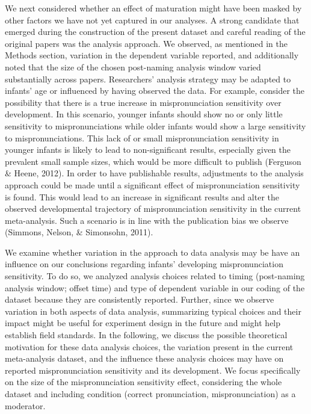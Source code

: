\documentclass[man, noextraspace]{apa6}
\begin{document}
We next considered whether an effect of maturation might have been masked by other factors we have not yet captured in our analyses. A strong candidate that emerged during the construction of the present dataset and careful reading of the original papers was the analysis approach. We observed, as mentioned in the Methods section, variation in the dependent variable reported, and additionally noted that the size of the chosen post-naming analysis window varied substantially across papers. Researchers' analysis strategy may be adapted to infants' age or influenced by having observed the data. For example, consider the possibility that there is a true increase in mispronunciation sensitivity over development. In this scenario, younger infants should show no or only little sensitivity to mispronunciations while older infants would show a large sensitivity to mispronunciations. This lack of or small mispronunciation sensitivity in younger infants is likely to lead to non-significant results, especially given the prevalent small sample sizes, which would be more difficult to publish (Ferguson \& Heene, 2012). In order to have publishable results, adjustments to the analysis approach could be made until a significant effect of mispronunciation sensitivity is found. This would lead to an increase in significant results and alter the observed developmental trajectory of mispronunciation sensitivity in the current meta-analysis. Such a scenario is in line with the publication bias we observe (Simmons, Nelson, \& Simonsohn, 2011).

We examine whether variation in the approach to data analysis may be have an influence on our conclusions regarding infants' developing mispronunciation sensitivity. To do so, we analyzed analysis choices related to timing (post-naming analysis window; offset time) and type of dependent variable in our coding of the dataset because they are consistently reported. Further, since we observe variation in both aspects of data analysis, summarizing typical choices and their impact might be useful for experiment design in the future and might help establish field standards. In the following, we discuss the possible theoretical motivation for these data analysis choices, the variation present in the current meta-analysis dataset, and the influence these analysis choices may have on reported mispronunciation sensitivity and its development. We focus specifically on the size of the mispronunciation sensitivity effect, considering the whole dataset and including condition (correct pronunciation, mispronunciation) as a moderator.
\end{document}
